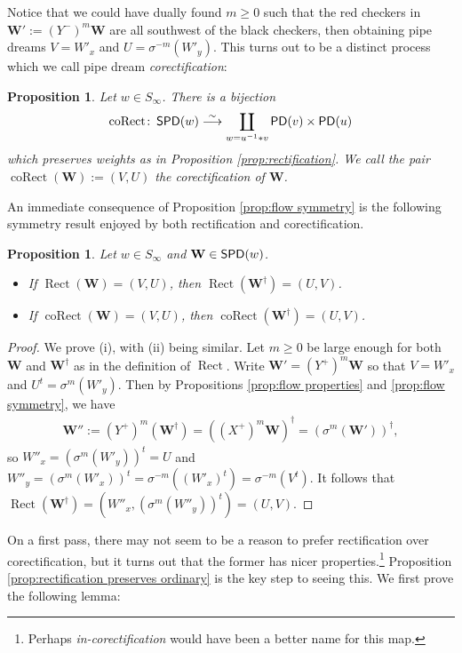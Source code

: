 \documentclass[11pt,reqno]{amsart} %
\newcommand{\bfW}{\mathbf{W}}
\DeclareMathOperator{\PD}{\sf{PD}}
\DeclareMathOperator{\SPD}{\sf{SPD}}
\DeclareMathOperator{\Rect}{Rect} %
\DeclareMathOperator{\coRect}{coRect} %
\newtheorem{proposition}[theorem]{Proposition}
\theoremstyle{definition}
\begin{document}
Notice that we could have dually found $m\geq 0$ such that the red checkers in $\bfW' := (Y^-)^m\bfW$ are all southwest of the black checkers, then obtaining pipe dreams $V = W'_x$ and $U = \sigma^{-m}(W'_y)$.
This turns out to be a distinct process which we call pipe dream \textit{corectification}:

\begin{proposition}
\label{prop:corectification}
Let $w\in S_\infty$.
There is a bijection \[
    \coRect\colon \SPD(w)
    \overset\sim\longrightarrow
    \coprod_{
        w = u^{-1} * v
    } \PD(v) \times \PD(u)
\] which preserves weights as in Proposition \ref{prop:rectification}.
We call the pair $\coRect(\bfW) := (V,U)$ the \textit{corectification} of $\bfW$.
\end{proposition}

An immediate consequence of Proposition \ref{prop:flow symmetry} is the following symmetry result enjoyed by both rectification and corectification.

\begin{proposition}
\label{prop:symmetry theorem}
Let $w\in S_\infty$ and $\bfW\in \SPD(w)$.
\begin{itemize}
    \item[(i)]
    If $\Rect(\bfW) = (V,U)$, then $\Rect(\bfW^\dagger) = (U,V)$.
    \item[(ii)]
    If $\coRect(\bfW) = (V,U)$, then $\coRect(\bfW^\dagger) = (U,V)$.
\end{itemize}
\end{proposition}

\begin{proof}
We prove (i), with (ii) being similar.
Let $m\geq 0$ be large enough for both $\bfW$ and $\bfW^\dagger$ as in the definition of $\Rect$.
Write $\bfW' = (Y^+)^m\bfW$ so that $V = W'_x$ and $U^t = \sigma^m(W'_y)$.
Then by Propositions \ref{prop:flow properties} and \ref{prop:flow symmetry}, we have \begin{align*}
    \bfW''
    := (Y^+)^m(\bfW^\dagger)
    = ((X^+)^m\bfW)^\dagger
    = (\sigma^m(\bfW'))^\dagger,
\end{align*}
so $
    W''_x = (\sigma^m(W'_y))^t = U
$ and $
    W''_y = (\sigma^m(W'_x))^t = \sigma^{-m}((W'_x)^t) = \sigma^{-m}(V^t)
$.
It follows that $\Rect(\bfW^\dagger) = (W''_x,(\sigma^m(W''_y))^t) = (U,V)$.
\end{proof}

On a first pass, there may not seem to be a reason to prefer rectification over corectification, but it turns out that the former has nicer properties.\footnote{
    Perhaps \textit{in-corectification} would have been a better name for this map.
}
Proposition \ref{prop:rectification preserves ordinary} is the key step to seeing this.
We first prove the following lemma:
\end{document}
